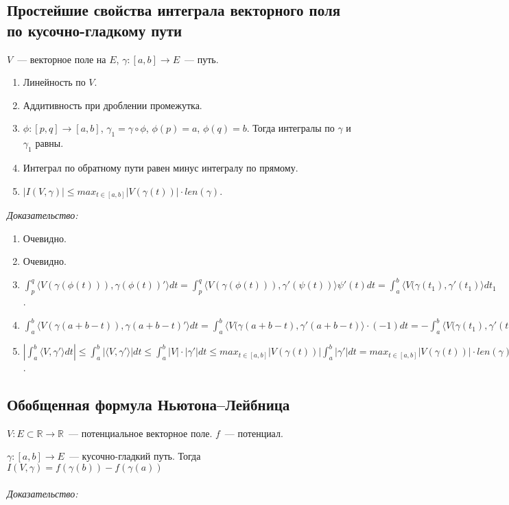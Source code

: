 \documentclass[paper=a4, fontsize=11pt]{article}
\begin{document}
\subsection{Простейшие свойства интеграла векторного поля по кусочно-гладкому пути}
$V$~--- векторное поле на $E$, $\gamma:[a,b] \rightarrow E$~--- путь.
\begin{enumerate}
    \item Линейность по $V$.
    \item Аддитивность при дроблении промежутка.
    \item $\phi:[p,q] \rightarrow [a,b]$, $\gamma_1 = \gamma \circ \phi$, $\phi(p)=a$, $\phi(q)=b$.
    Тогда интегралы по $\gamma$ и $\gamma_1$ равны.
    \item Интеграл по обратному пути равен минус интегралу по прямому.
    \item $|I(V,\gamma)| \leq max_{t \in [a,b]} |V(\gamma(t))| \cdot len(\gamma)$.
\end{enumerate}

\emph{Доказательство:}
\begin{enumerate}
    \item Очевидно.
    \item Очевидно.
    \item $\int_p^q \langle V(\gamma(\phi(t))),\gamma(\phi(t))' \rangle dt =
    \int_p^q \langle V(\gamma(\phi(t))),\gamma'(\psi(t)) \rangle \psi'(t)dt
     = \int_a^b \langle V(\gamma(t_1),\gamma'(t_1) \rangle dt_1$.
    \item $\int_a^b \langle V(\gamma(a+b-t)),\gamma(a+b-t)' \rangle dt =
    \int_a^b \langle V(\gamma(a+b-t),\gamma'(a+b-t) \rangle \cdot(-1)dt =
    -\int_a^b \langle V(\gamma(t_1),\gamma'(t_1) \rangle dt_1$
    \item $|\int_a^b \langle V,\gamma' \rangle dt| \leq \int_a^b |\langle V,\gamma' \rangle| dt \leq
    \int_a^b |V|\cdot|\gamma'| dt \leq max_{t \in [a,b]} |V(\gamma(t))| \int_a^b |\gamma'|dt = 
    max_{t \in [a,b]} |V(\gamma(t))| \cdot len(\gamma)$.
\end{enumerate}

\subsection{Обобщенная формула Ньютона--Лейбница}
$V: E \subset \mathds{R} \rightarrow \mathds{R}$~--- потенциальное векторное поле. $f$~--- потенциал.

$\gamma:[a,b] \rightarrow E$~--- кусочно-гладкий путь. Тогда $I(V, \gamma) = f(\gamma(b)) - f(\gamma(a))$
\\\\
\emph{Доказательство:}
\end{document}

